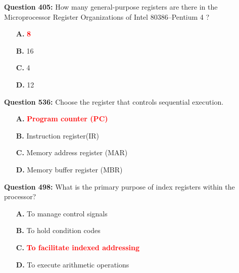 \documentclass[12pt,a4paper]{article}
\begin{document}
\vspace{0.5cm}

\vspace{0.5cm}

\textbf{Question 405:} How many general-purpose registers are there in the Microprocessor Register Organizations of Intel 80386–Pentium 4 ?

\begin{itemize}
    \item[\textbf{A.}] \textcolor{red}{\textbf{8}}
    \item[\textbf{B.}] 16
    \item[\textbf{C.}] 4
    \item[\textbf{D.}] 12
\end{itemize}

\vspace{0.5cm}

\vspace{0.5cm}

\textbf{Question 536:} Choose the register that controls sequential execution.

\begin{itemize}
    \item[\textbf{A.}] \textcolor{red}{\textbf{Program counter (PC)}}
    \item[\textbf{B.}] Instruction register(IR)
    \item[\textbf{C.}] Memory address register (MAR)
    \item[\textbf{D.}] Memory buffer register (MBR)
\end{itemize}

\vspace{0.5cm}

\vspace{0.5cm}

\textbf{Question 498:} What is the primary purpose of index registers within the processor?

\begin{itemize}
    \item[\textbf{A.}] To manage control signals
    \item[\textbf{B.}] To hold condition codes
    \item[\textbf{C.}] \textcolor{red}{\textbf{To facilitate indexed addressing}}
    \item[\textbf{D.}] To execute arithmetic operations
\end{itemize}

\vspace{0.5cm}
\end{document}
